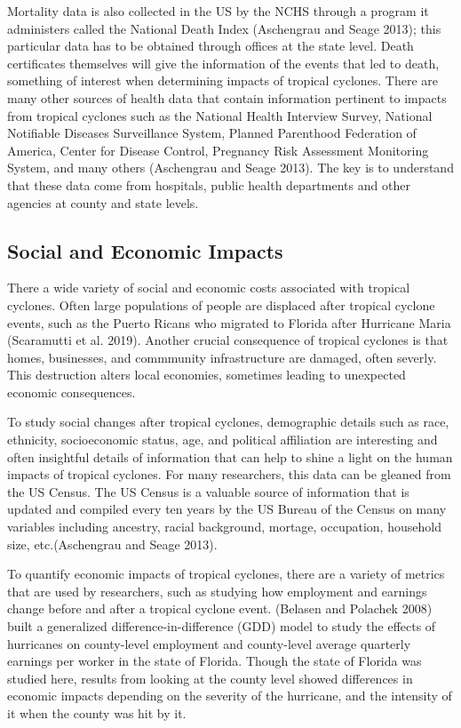 \documentclass[
]{article}
\begin{document}
Mortality data is also collected in the US by the NCHS through a program
it administers called the National Death Index (Aschengrau and Seage
2013); this particular data has to be obtained through offices at the
state level. Death certificates themselves will give the information of
the events that led to death, something of interest when determining
impacts of tropical cyclones. There are many other sources of health
data that contain information pertinent to impacts from tropical
cyclones such as the National Health Interview Survey, National
Notifiable Diseases Surveillance System, Planned Parenthood Federation
of America, Center for Disease Control, Pregnancy Risk Assessment
Monitoring System, and many others (Aschengrau and Seage 2013). The key
is to understand that these data come from hospitals, public health
departments and other agencies at county and state levels.

\hypertarget{social-and-economic-impacts}{%
\subsection{Social and Economic
Impacts}\label{social-and-economic-impacts}}

There a wide variety of social and economic costs associated with
tropical cyclones. Often large populations of people are displaced after
tropical cyclone events, such as the Puerto Ricans who migrated to
Florida after Hurricane Maria (Scaramutti et al. 2019). Another crucial
consequence of tropical cyclones is that homes, businesses, and
commmunity infrastructure are damaged, often severly. This destruction
alters local economies, sometimes leading to unexpected economic
consequences.

To study social changes after tropical cyclones, demographic details
such as race, ethnicity, socioeconomic status, age, and political
affiliation are interesting and often insightful details of information
that can help to shine a light on the human impacts of tropical
cyclones. For many researchers, this data can be gleaned from the US
Census. The US Census is a valuable source of information that is
updated and compiled every ten years by the US Bureau of the Census on
many variables including ancestry, racial background, mortage,
occupation, household size, etc.(Aschengrau and Seage 2013).

To quantify economic impacts of tropical cyclones, there are a variety
of metrics that are used by researchers, such as studying how employment
and earnings change before and after a tropical cyclone event. (Belasen
and Polachek 2008) built a generalized difference-in-difference (GDD)
model to study the effects of hurricanes on county-level employment and
county-level average quarterly earnings per worker in the state of
Florida. Though the state of Florida was studied here, results from
looking at the county level showed differences in economic impacts
depending on the severity of the hurricane, and the intensity of it when
the county was hit by it.
\end{document}

